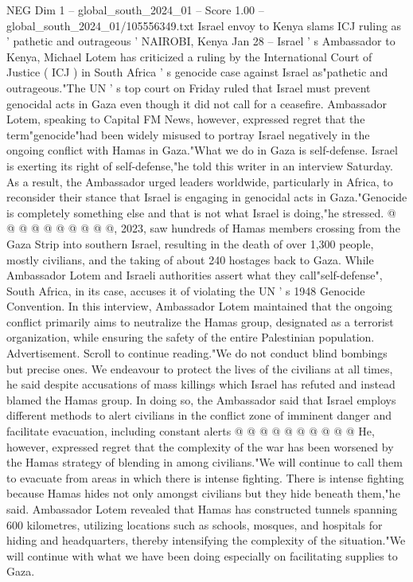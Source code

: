 \begin{textsample}{NEG Dim 1 – global\_south\_2024\_01 – Score 1.00 – global\_south\_2024\_01/105556349.txt}  \label{ex:f1_neg_348}
Israel envoy to Kenya slams ICJ ruling as ' pathetic and outrageous ' NAIROBI, Kenya Jan 28 -- Israel ' s Ambassador to Kenya, Michael Lotem has criticized a ruling by the International Court of Justice ( ICJ ) in South Africa ' s genocide case against Israel as"pathetic and outrageous."The UN ' s top court on Friday ruled that Israel must prevent genocidal acts in Gaza even though it did not call for a ceasefire.
Ambassador Lotem, speaking to Capital FM News, however, expressed regret that the term"genocide"had been widely misused to portray Israel negatively in the ongoing conflict with Hamas in Gaza."What we do in Gaza is self-defense.
Israel is exerting its right of self-defense,"he told this writer in an interview Saturday.
As a result, the Ambassador urged leaders worldwide, particularly in Africa, to reconsider their stance that Israel is engaging in genocidal acts in Gaza."Genocide is completely something else and that is not what Israel is doing,"he stressed. @ @ @ @ @ @ @ @ @ @, 2023, saw hundreds of Hamas members crossing from the Gaza Strip into southern Israel, resulting in the death of over 1,300 people, mostly civilians, and the taking of about 240 hostages back to Gaza.
While Ambassador Lotem and Israeli authorities assert what they call"self-defense", South Africa, in its case, accuses it of violating the UN ' s 1948 Genocide Convention.
In this interview, Ambassador Lotem maintained that the ongoing conflict primarily aims to neutralize the Hamas group, designated as a terrorist organization, while ensuring the safety of the entire Palestinian population.
Advertisement.
Scroll to continue reading."We do not conduct blind bombings but precise ones.
We endeavour to protect the lives of the civilians at all times, he said despite accusations of mass killings which Israel has refuted and instead blamed the Hamas group.
In doing so, the Ambassador said that Israel employs different methods to alert civilians in the conflict zone of imminent danger and facilitate evacuation, including constant alerts @ @ @ @ @ @ @ @ @ @ He, however, expressed regret that the complexity of the war has been worsened by the Hamas strategy of blending in among civilians."We will continue to call them to evacuate from areas in which there is intense fighting.
There is intense fighting because Hamas hides not only amongst civilians but they hide beneath them,"he said.
Ambassador Lotem revealed that Hamas has constructed tunnels spanning 600 kilometres, utilizing locations such as schools, mosques, and hospitals for hiding and headquarters, thereby intensifying the complexity of the situation."We will continue with what we have been doing especially on facilitating supplies to Gaza.

\end{textsample}
